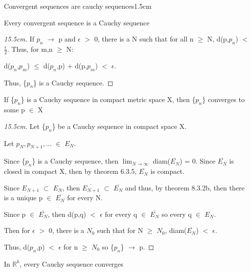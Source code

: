     \begin{ltheorem}{Convergent sequences are cauchy sequences}{1.5cm}
        \item Every convergent sequence is a Cauchy sequence

            \begin{proof}[15.5cm]
                If $p_n$ $\rightarrow$ p and $\epsilon$ $>$ 0, there is a
                N such that for all n $\geq$ N, d(p,$p_n$) $<$ $\frac{\epsilon}{2}$.
                Thus, for m,n $\geq$ N:

				\hspace{0.5cm}
				d($p_n$,$p_m$) $\leq$ d($p_n$,p) + d(p,$p_m$) $<$ $\epsilon$.

				Thus, \{$p_n$\} is a Cauchy sequence.                
            \end{proof}

        \item If \{$p_n$\} is a Cauchy sequence in compact metric space X,
            then \{$p_n$\} converges to some p $\in$ X

            \begin{proof}[15.5cm]
                Let \{$p_n$\} be a Cauchy sequence in compact space X.

				Let	$p_N, p_{N+1}, ... $ $\in$ $E_N$.

				Since \{$p_n$\} is a Cauchy sequence, then
				$\lim_{N \rightarrow \infty}$ diam($\overline{E_N}$) = 0.
				Since $\overline{E_N}$ is closed in compact X, then
				by {\color{red} theorem 6.3.5}, $\overline{E_N}$ is compact.

				Since $E_{N+1}$ $\subset$ $E_N$, then $\overline{E_{N+1}}$
				$\subset$ $\overline{E_N}$ and thus, by
                {\color{red} theorem 8.3.2b},
				then there is a unique p $\in$ $\overline{E_N}$ for every N.

				Since p $\in$ $\overline{E_N}$, then d(p,q) $<$ $\epsilon$ for
                every q $\in$ $\overline{E_N}$ so every q $\in$ $E_N$.

                Then for $\epsilon$ $>$ 0, there is a $N_0$ such that
                for N $\geq$ $N_0$, diam($\overline{E_N}$) $<$ $\epsilon$.

				Thus, d($p_n$,p) $<$ $\epsilon$ for n $\geq$ $N_0$ so
                \{$p_n$\} $\rightarrow$ p.
            \end{proof}

        \item In $\mathbb{R}^k$, every Cauchy sequence converges
        

\end{ltheorem}
